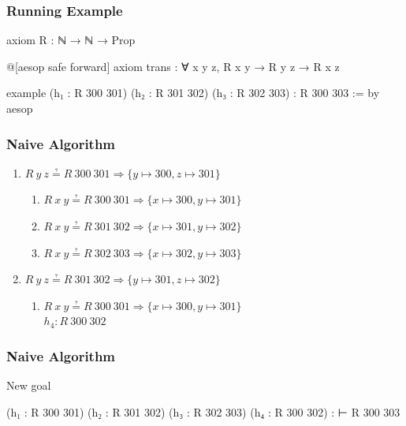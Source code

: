\begin{frame}[fragile]
  \frametitle{Running Example}

  \begin{leancode}
    axiom R : ℕ → ℕ → Prop

    @[aesop safe forward]
    axiom trans : ∀ x y z, R x y → R y z → R x z

    example
        (h₁ : R 300 301)
        (h₂ : R 301 302)
        (h₃ : R 302 303) :
        R 300 303 := by
      aesop
  \end{leancode}
\end{frame}

\begin{frame}
  \frametitle{Naive Algorithm}

  \begin{enumerate}[<+->]
    \item $R~y~z ≟ R~300~301 ⇒ \{y ↦ 300, z ↦ 301\}$ \good
          \begin{enumerate}[<+->]
            \item $R~x~y ≟ R~300~301 ⇒ \{x ↦ 300, y ↦ 301\}$ \bad
            \item $R~x~y ≟ R~301~302 ⇒ \{x ↦ 301, y ↦ 302\}$ \bad
            \item $R~x~y ≟ R~302~303 ⇒ \{x ↦ 302, y ↦ 303\}$ \bad
          \end{enumerate}
    \item $R~y~z ≟ R~301~302 ⇒ \{y ↦ 301, z ↦ 302\}$ \good
          \begin{enumerate}[<+->]
            \item $R~x~y ≟ R~300~301 ⇒ \{x ↦ 300, y ↦ 301\}$ \good \\
                   $h_{4} : R~300~302$
          \end{enumerate}
  \end{enumerate}
\end{frame}

\begin{frame}[fragile]
  \frametitle{Naive Algorithm}

  \begin{block}{New goal}
    \begin{leancode}
        (h₁ : R 300 301)
        (h₂ : R 301 302)
        (h₃ : R 302 303)
        (h₄ : R 300 302) :
        ⊢ R 300 303
    \end{leancode}
  \end{block}
\end{frame}

